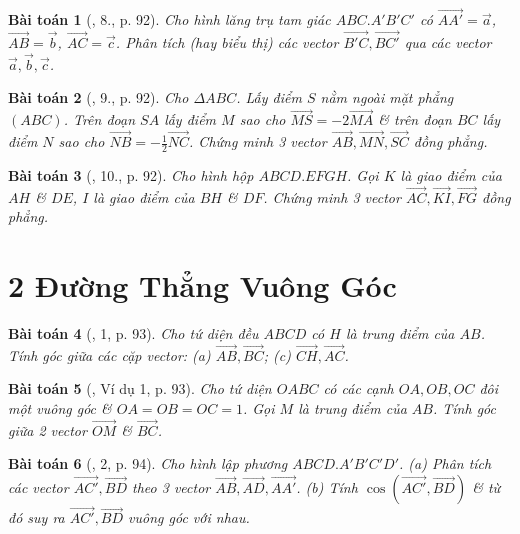 \documentclass{article}
\numberwithin{equation}{section}
\newtheorem{baitoan}{Bài toán}
\begin{document}
\begin{baitoan}[\cite{SGK_Toan_11_hinh_hoc_co_ban}, 8., p. 92]
	Cho hình lăng trụ tam giác $ABC.A'B'C'$ có $\overrightarrow{AA'} = \vec{a}$, $\overrightarrow{AB} = \vec{b}$, $\overrightarrow{AC} = \vec{c}$. Phân tích (hay biểu thị) các vector $\overrightarrow{B'C},\overrightarrow{BC'}$ qua các vector $\vec{a},\vec{b},\vec{c}$.
\end{baitoan}

\begin{baitoan}[\cite{SGK_Toan_11_hinh_hoc_co_ban}, 9., p. 92]
	Cho $\Delta ABC$. Lấy điểm $S$ nằm ngoài mặt phẳng $(ABC)$. Trên đoạn $SA$ lấy điểm $M$ sao cho $\overrightarrow{MS} = -2\overrightarrow{MA}$ \& trên đoạn $BC$ lấy điểm $N$ sao cho $\overrightarrow{NB} = -\frac{1}{2}\overrightarrow{NC}$. Chứng minh 3 vector $\overrightarrow{AB},\overrightarrow{MN},\overrightarrow{SC}$ đồng phẳng.
\end{baitoan}

\begin{baitoan}[\cite{SGK_Toan_11_hinh_hoc_co_ban}, 10., p. 92]
	Cho hình hộp $ABCD.EFGH$. Gọi $K$ là giao điểm của $AH$ \& $DE$, $I$ là giao điểm của $BH$ \& $DF$. Chứng minh 3 vector $\overrightarrow{AC},\overrightarrow{KI},\overrightarrow{FG}$ đồng phẳng.
\end{baitoan}


\section{2 Đường Thẳng Vuông Góc}

\begin{baitoan}[\cite{SGK_Toan_11_hinh_hoc_co_ban}, 1, p. 93]
	Cho tứ diện đều $ABCD$ có $H$ là trung điểm của $AB$. Tính góc giữa các cặp vector: (a) $\overrightarrow{AB},\overrightarrow{BC}$; (c) $\overrightarrow{CH},\overrightarrow{AC}$.
\end{baitoan}

\begin{baitoan}[\cite{SGK_Toan_11_hinh_hoc_co_ban}, Ví dụ 1, p. 93]
	Cho tứ diện $OABC$ có các cạnh $OA,OB,OC$ đôi một vuông góc \& $OA = OB = OC = 1$. Gọi $M$ là trung điểm của $AB$. Tính góc giữa 2 vector $\overrightarrow{OM}$ \& $\overrightarrow{BC}$.
\end{baitoan}

\begin{baitoan}[\cite{SGK_Toan_11_hinh_hoc_co_ban}, 2, p. 94]
	Cho hình lập phương $ABCD.A'B'C'D'$. (a) Phân tích các vector $\overrightarrow{AC'},\overrightarrow{BD}$ theo 3 vector $\overrightarrow{AB},\overrightarrow{AD},\overrightarrow{AA'}$. (b) Tính $\cos(\overrightarrow{AC'},\overrightarrow{BD})$ \& từ đó suy ra $\overrightarrow{AC'},\overrightarrow{BD}$ vuông góc với nhau.
\end{baitoan}
\end{document}
